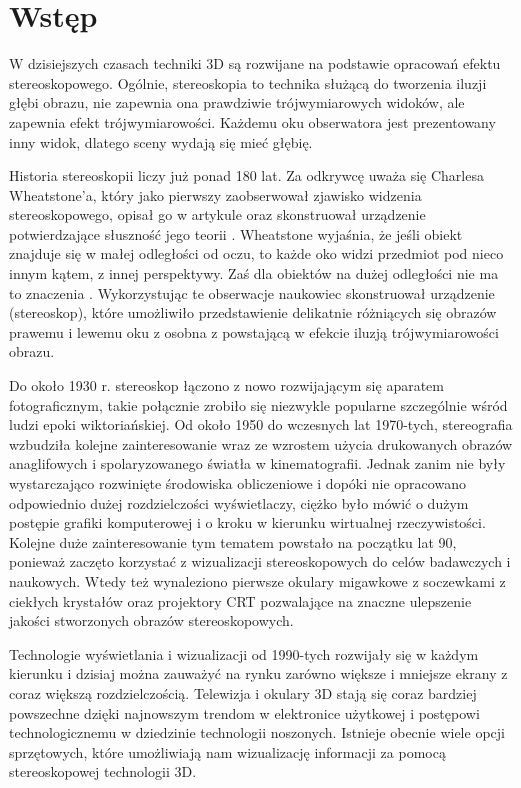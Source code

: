 
\graphicspath{{images/}}



\tableofcontents
\thispagestyle{empty}
\thesisstyle
\newpage 

\section[Wstęp]{Wstęp}
W dzisiejszych czasach techniki 3D są rozwijane na podstawie opracowań efektu stereoskopowego. Ogólnie, stereoskopia to technika służącą do tworzenia iluzji głębi obrazu, nie zapewnia ona prawdziwie trójwymiarowych widoków, ale zapewnia efekt trójwymiarowości. Każdemu oku obserwatora jest prezentowany inny widok, dlatego sceny wydają się mieć głębię.

Historia stereoskopii liczy już ponad 180 lat. Za odkrywcę uważa się Charlesa Wheatstone'a, który jako pierwszy zaobserwował zjawisko widzenia stereoskopowego, opisał go w artykule oraz skonstruował urządzenie potwierdzające słuszność jego teorii \cite{stereoscopehistory}. Wheatstone wyjaśnia, że jeśli obiekt znajduje się w małej odległości od oczu, to każde oko widzi przedmiot pod nieco innym kątem, z innej perspektywy. Zaś dla obiektów na dużej odległości nie ma to znaczenia \cite{wheatstone}. Wykorzystując te obserwacje naukowiec skonstruował urządzenie (stereoskop), które umożliwiło przedstawienie delikatnie różniących się obrazów prawemu i lewemu oku z osobna z powstającą w efekcie iluzją trójwymiarowości obrazu.

Do około 1930 r. stereoskop łączono z nowo rozwijającym się aparatem fotograficznym, takie połącznie zrobiło się niezwykle popularne szczególnie wśród ludzi epoki wiktoriańskiej. Od około 1950 do wczesnych lat 1970-tych, stereografia wzbudziła kolejne zainteresowanie wraz ze wzrostem użycia drukowanych obrazów anaglifowych i spolaryzowanego światła w kinematografii. Jednak zanim nie były wystarczająco rozwinięte środowiska obliczeniowe i dopóki nie opracowano odpowiednio dużej rozdzielczości wyświetlaczy, ciężko było mówić o dużym postępie grafiki komputerowej i o kroku w kierunku wirtualnej rzeczywistości. Kolejne duże zainteresowanie tym tematem powstało na początku lat 90, ponieważ zaczęto korzystać z wizualizacji stereoskopowych do celów badawczych i naukowych. Wtedy też wynaleziono pierwsze okulary migawkowe z soczewkami z ciekłych krystałów oraz projektory CRT pozwalające na znaczne ulepszenie jakości stworzonych obrazów stereoskopowych.

Technologie wyświetlania i wizualizacji od 1990-tych rozwijały się w każdym kierunku i dzisiaj można zauważyć na rynku zarówno większe i mniejsze ekrany z coraz większą rozdzielczością. Telewizja i okulary 3D stają się coraz bardziej powszechne dzięki najnowszym trendom w elektronice użytkowej i postępowi technologicznemu w dziedzinie technologii noszonych. Istnieje obecnie wiele opcji sprzętowych, które umożliwiają nam wizualizację informacji za pomocą stereoskopowej technologii 3D. 

